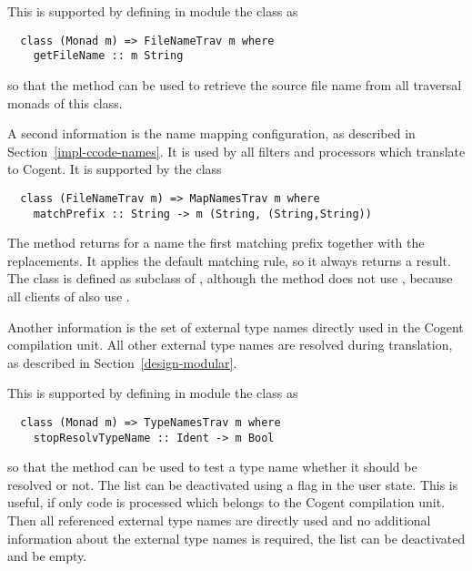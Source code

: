 This is supported by defining in module  the class  as
\begin{verbatim}
  class (Monad m) => FileNameTrav m where
    getFileName :: m String
\end{verbatim}
so that the method  can be used to retrieve the source file name from all traversal monads of 
this class. 

A second information is the name mapping configuration, as described in Section~\ref{impl-ccode-names}.
It is used by all filters and processors which translate to Cogent. It is supported by the class 
\begin{verbatim}
  class (FileNameTrav m) => MapNamesTrav m where
    matchPrefix :: String -> m (String, (String,String))
\end{verbatim}
The method  returns for a name the first matching prefix together with the replacements. It 
applies the default matching rule, so it always returns a result. The class is defined as subclass of 
, although the method does not use , because all clients of 
also use .

Another information is the set of external type names directly used in the Cogent compilation unit. All other 
external type names are resolved during translation, as described in Section~\ref{design-modular}.

This is supported by defining in module  the class  as
\begin{verbatim}
  class (Monad m) => TypeNamesTrav m where
    stopResolvTypeName :: Ident -> m Bool
\end{verbatim}
so that the method  can be used to test a type name whether it should be resolved or not.
The list can be deactivated using a flag in the user state. This is useful, if only code is processed which belongs
to the Cogent compilation unit. Then all referenced external type names are directly used and no additional information about
the external type names is required, the list can be deactivated and be empty.

